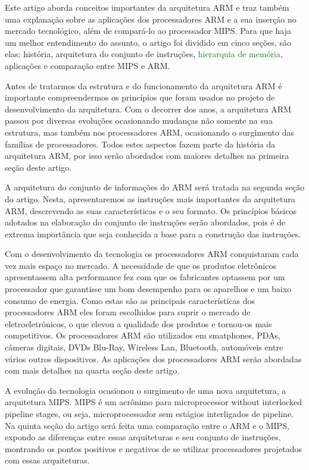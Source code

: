 \documentclass[12pt]{article}
\begin{document}
Este artigo aborda conceitos importantes da arquitetura ARM e traz também uma explanação sobre as aplicações dos processadores ARM e a sua inserção no mercado tecnológico, além de compará-lo ao processador MIPS. Para que haja um melhor entendimento do assunto, o artigo foi dividido em cinco seções, são elas: história, arquitetura do conjunto de instruções, \textcolor{green}{hierarquia de memória}, aplicações e comparação entre MIPS e ARM.

Antes de tratarmos da estrutura e do funcionamento da arquitetura ARM é importante compreendermos os princípios que foram usados no projeto de desenvolvimento da arquitetura. Com o decorrer dos anos, a arquitetura ARM passou por diversas evoluções ocasionando mudanças não somente na sua estrutura, mas também nos processadores ARM, ocasionando o surgimento das famílias de processadores. Todos estes aspectos fazem parte da história da arquitetura ARM, por isso serão abordados com maiores detalhes na primeira seção deste artigo.

A arquitetura do conjunto de informações do ARM será tratada na segunda seção do artigo. Nesta, apresentaremos as instruções mais importantes da arquitetura ARM, descrevendo as suas características e o seu formato. Os princípios básicos adotados na elaboração do conjunto de instruções serão abordados, pois é de extrema importância que seja conhecida a base para a construção das instruções.

Com o desenvolvimento da tecnologia os processadores ARM conquistaram cada vez mais espaço no mercado. A necessidade de que os produtos eletrônicos apresentassem alta performance fez com que os fabricantes optassem por um processador que garantisse um bom desempenho para os aparelhos e um baixo consumo de energia. Como estas são as principais características dos processadores ARM eles foram escolhidos para suprir o mercado de eletroeletrônicos, o que elevou a qualidade dos produtos e tornou-os mais competitivos. Os processadores ARM são utilizados em smatphones, PDAs, câmeras digitais, DVDs Blu-Ray, Wireless Lan, Bluetooth, automóveis entre vários outros dispositivos. As aplicações dos processadores ARM serão abordadas com mais detalhes na quarta seção deste artigo.

A evolução da tecnologia ocasionou o surgimento de uma nova arquitetura, a arquitetura MIPS. MIPS é um acrônimo para microprocessor without interlocked pipeline stages, ou seja, microprocessador sem estágios interligados de pipeline. Na quinta seção do artigo será feita uma comparação entre o ARM e o MIPS, expondo as diferenças entre essas arquiteturas e seu conjunto de instruções, montrando os pontos positivos e negativos de se utilizar processadores projetados com essas arquiteturas.   





\end{document}
